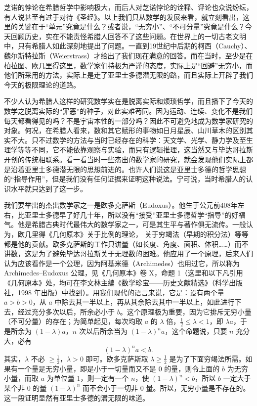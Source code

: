芝诺的悖论在希腊哲学中影响极大，而后人对芝诺悖论的诠释、评论也众说纷纭，有人说甚至有过于对待《圣经》。以上我们只从数学的发展来看，就立刻看出，这里的关键在于“单元”究竟是什么？或者说，“无穷小”、“不可分量”究竟是什么？今天回顾历史，实在不能责怪希腊人回答不了这些问题。在世界上的一切古老文明中，只有希腊人如此深刻地提出了问题。一直到19世纪中后期的柯西（Cauchy）、魏尔斯特拉斯（Weierstrass）才给出了我们现在满意的回答。而在当时，至少是在柏拉图、欧几里得这里，数学家们持极为严谨的态度，实际上是“回避”无穷小，而他们所采用的方法，实际上是走了亚里士多德潜无限的路，而且实际上开辟了我们今天的极限理论的道路。

不少人认为希腊人这样的研究数学实在是脱离实际和烦琐哲学，而且播下了今天的数学之脱离实际的“罪恶”的种子，对此实难苟同。因为运动、连续、变化不是我们每天都看得见的吗？不是宇宙本性的一部分吗？因此不可避免地成为数学家研究的对象。何况，在希腊人看来，数和其它赋形的事物如日月星辰、山川草木的区别其实不大。只不过数学的方法与当时已经存在的科学：天文学、光学、静力学及至生理学等等不同，它不能依靠观察与实验，而只有逻辑推理，这当然又与毕达哥拉斯开创的传统相联系。看一看当时一些杰出的数学家的研究，就会发现他们实际上都是沿着亚里士多德潜无限的思想前进的。也许人们说这是亚里士多德的哲学思想的“指导作用”，但是我们没有任何证据来证明这种说法。宁可说，当时希腊人的认识水平就只达到了这一步。

我们要举出的杰出数学家之一是欧多克萨斯（Eudoxus）。他生于公元前408年左右，比亚里士多德早了好几十年，所以没有“接受”亚里士多德哲学“指导”的好福气。他是希腊古典时代最伟大的数学家之一，可是其生平与著作俱无流传。一般认为，欧几里得《几何原本》关于比例的理论，
关于穷竭法（早期的积分法）等等都是他的贡献。欧多克萨斯的工作只讲量（如长度、角度、面积、体积……）而不讲数，这是为了避免毕达哥拉斯关于无理数的困难。他应用了一个原理，后来人们认为应该看作是一个公理，因为阿基米德（Archimedes）也用过它，所以称为 Archimedes--Eudoxus 公理，见《几何原本》卷 X，命题 1（这里和以下凡引用《几何原本》处，均可在李文林主编《数学珍宝——历史文献精选》（科学出版社，1998 年出版）中找到）。用我们现代的语言来说，它是：设有两个量 $a>b>0$，从 $a$ 中除去其一半以上，再从其余除去其中一半以上，如此进行下去，经过充分多次以后，所余必小于 $b$。这个原理极为重要，因为它排斥无穷小量（不可分量）的存在；为简单起见，每次均取 $a$ 的 $\lambda$ 倍，$\frac12\le \lambda<1$，即 $\lambda a$，于是所余为 $(1-\lambda)a$，$n$ 次以后所余当为 $(1-\lambda)^n a$，这个命题说，只要 $n$ 充分大，必有
\[
(1-\lambda)^n a<b.
\]
其实，$\lambda$ 不必 $\geq \frac12$，$\lambda>0$ 即可。欧多克萨斯取 $\lambda\geq\frac12$ 是为了下面穷竭法所需。如果有一个量是无穷小量，即是小于一切量而又不是 $0$ 的量，则令上面的 $b$ 为无穷小量，而取 $a$ 为单位量 $1$，则一定有一个 $n$，使 $(1-\lambda)^n<b$，所以 $b$ 一定大于某个非 $0$ 的量 $(1-\lambda)^n$ 而不会小于一切非 $0$ 量。所以，无穷小量是不存在的。这一段证明显然有亚里士多德的潜无限的味道。

